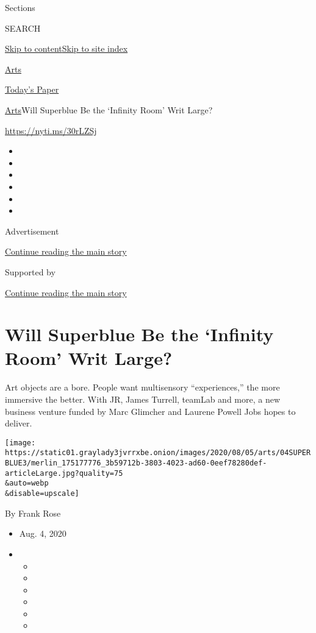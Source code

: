 Sections

SEARCH

\protect\hyperlink{site-content}{Skip to
content}\protect\hyperlink{site-index}{Skip to site index}

\href{https://www.nytimes3xbfgragh.onion/section/arts}{Arts}

\href{https://myaccount.nytimes3xbfgragh.onion/auth/login?response_type=cookie\&client_id=vi}{}

\href{https://www.nytimes3xbfgragh.onion/section/todayspaper}{Today's
Paper}

\href{/section/arts}{Arts}\textbar{}Will Superblue Be the `Infinity
Room' Writ Large?

\url{https://nyti.ms/30rLZSj}

\begin{itemize}
\item
\item
\item
\item
\item
\item
\end{itemize}

Advertisement

\protect\hyperlink{after-top}{Continue reading the main story}

Supported by

\protect\hyperlink{after-sponsor}{Continue reading the main story}

\hypertarget{will-superblue-be-the-infinity-room-writ-large}{%
\section{Will Superblue Be the `Infinity Room' Writ
Large?}\label{will-superblue-be-the-infinity-room-writ-large}}

Art objects are a bore. People want multisensory ``experiences,'' the
more immersive the better. With JR, James Turrell, teamLab and more, a
new business venture funded by Marc Glimcher and Laurene Powell Jobs
hopes to deliver.

\texttt{[image: https://static01.graylady3jvrrxbe.onion/images/2020/08/05/arts/04SUPERBLUE3/merlin\_175177776\_3b59712b-3803-4023-ad60-0eef78280def-articleLarge.jpg?quality=75\\\&auto=webp\\\&disable=upscale]}

By Frank Rose

\begin{itemize}
\item
  Aug. 4, 2020
\item
  \begin{itemize}
  \item
  \item
  \item
  \item
  \item
  \item
  \end{itemize}
\end{itemize}

